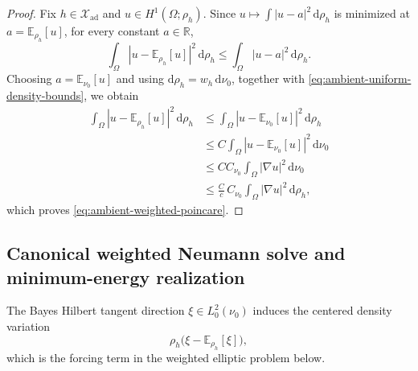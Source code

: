 \documentclass{article}
\theoremstyle{definition}
\renewcommand{\d}{\mathrm{d}}
\begin{document}
\begin{proof}
    Fix \(h\in\mathcal X_{\mathrm{ad}}\) and \(u\in H^1(\Omega;\rho_h)\). Since
    \(u\mapsto \int |u-a|^2\,\d\rho_h\) is minimized at \(a=\mathbb E_{\rho_h}[u]\), for every
    constant \(a\in\mathbb R\),
    \[
        \int_\Omega
        \left|u-\mathbb E_{\rho_h}[u]\right|^2\,\d\rho_h
        \le
        \int_\Omega |u-a|^2\,\d\rho_h.
    \]
    Choosing \(a=\mathbb E_{\nu_0}[u]\) and using \(\d\rho_h=w_h\,\d\nu_0\), together with
    \eqref{eq:ambient-uniform-density-bounds}, we obtain
    \begin{align*}
        \int_\Omega
        \left|u-\mathbb E_{\rho_h}[u]\right|^2\,\d\rho_h
         & \le
        \int_\Omega \left|u-\mathbb E_{\nu_0}[u]\right|^2\,\d\rho_h \\
         & \le
        C
        \int_\Omega \left|u-\mathbb E_{\nu_0}[u]\right|^2\,\d\nu_0  \\
         & \le
        C C_{\nu_0}\int_\Omega |\nabla u|^2\,\d\nu_0                \\
         & \le
        \frac{C}{c}\,C_{\nu_0}\int_\Omega |\nabla u|^2\,\d\rho_h,
    \end{align*}
    which proves \eqref{eq:ambient-weighted-poincare}.
\end{proof}

\subsection{Canonical weighted Neumann solve and minimum-energy realization}

The Bayes Hilbert tangent direction \(\xi\in L^2_0(\nu_0)\) induces the centered density
variation
\[
    \rho_h\bigl(\xi-\mathbb E_{\rho_h}[\xi]\bigr),
\]
which is the forcing term in the weighted elliptic problem below.
\end{document}
